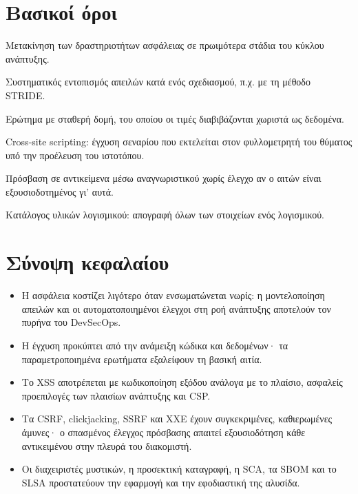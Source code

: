 \section*{Βασικοί όροι}
\begin{description}[style=nextline,leftmargin=1.2em]
  \item[Shift-left] Μετακίνηση των δραστηριοτήτων ασφάλειας σε πρωιμότερα στάδια του κύκλου ανάπτυξης.
  \item[Μοντελοποίηση απειλών] Συστηματικός εντοπισμός απειλών κατά ενός σχεδιασμού, π.χ. με τη μέθοδο STRIDE.
  \item[Παραμετροποιημένο ερώτημα] Ερώτημα με σταθερή δομή, του οποίου οι τιμές διαβιβάζονται χωριστά ως δεδομένα.
  \item[XSS] Cross-site scripting: έγχυση σεναρίου που εκτελείται στον φυλλομετρητή του θύματος υπό την προέλευση του ιστοτόπου.
  \item[IDOR / BOLA] Πρόσβαση σε αντικείμενα μέσω αναγνωριστικού χωρίς έλεγχο αν ο αιτών είναι εξουσιοδοτημένος γι' αυτά.
  \item[SBOM] Κατάλογος υλικών λογισμικού: απογραφή όλων των στοιχείων ενός λογισμικού.
\end{description}

\section*{Σύνοψη κεφαλαίου}
\begin{itemize}
  \item Η ασφάλεια κοστίζει λιγότερο όταν ενσωματώνεται νωρίς: η μοντελοποίηση απειλών και οι αυτοματοποιημένοι έλεγχοι στη ροή ανάπτυξης αποτελούν τον πυρήνα του DevSecOps.
  \item Η έγχυση προκύπτει από την ανάμειξη κώδικα και δεδομένων· τα παραμετροποιημένα ερωτήματα εξαλείφουν τη βασική αιτία.
  \item Το XSS αποτρέπεται με κωδικοποίηση εξόδου ανάλογα με το πλαίσιο, ασφαλείς προεπιλογές των πλαισίων ανάπτυξης και CSP.
  \item Τα CSRF, clickjacking, SSRF και XXE έχουν συγκεκριμένες, καθιερωμένες άμυνες· ο σπασμένος έλεγχος πρόσβασης απαιτεί εξουσιοδότηση κάθε αντικειμένου στην πλευρά του διακομιστή.
  \item Οι διαχειριστές μυστικών, η προσεκτική καταγραφή, η SCA, τα SBOM και το SLSA προστατεύουν την εφαρμογή και την εφοδιαστική της αλυσίδα.
\end{itemize}

